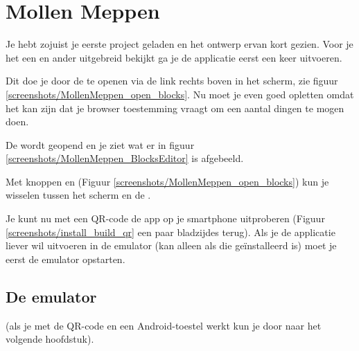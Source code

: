 \chapter{Mollen Meppen}

Je hebt zojuist je eerste project geladen en het ontwerp ervan kort gezien. Voor je het een en ander uitgebreid bekijkt ga je de applicatie eerst een keer uitvoeren.

Dit doe je door de  te openen via de  link rechts boven in het scherm, zie figuur \ref{screenshots/MollenMeppen_open_blocks}. Nu moet je even goed opletten omdat het kan zijn dat je browser toestemming vraagt om een aantal dingen te mogen doen.

De  wordt geopend en je ziet wat er in figuur \ref{screenshots/MollenMeppen_BlocksEditor} is afgebeeld.


Met knoppen  en  (Figuur \ref{screenshots/MollenMeppen_open_blocks}) kun je wisselen tussen het  scherm en de .

Je kunt nu met een QR-code de app op je smartphone uitproberen (Figuur \ref{screenshots/install_build_qr} een paar bladzijdes terug). 
Als je de applicatie liever wil uitvoeren in de emulator (kan alleen als die ge\"installeerd is) moet je eerst de emulator opstarten. 

\section{De emulator}
(als je met de QR-code en een Android-toestel werkt kun je door naar het volgende hoofdstuk).

